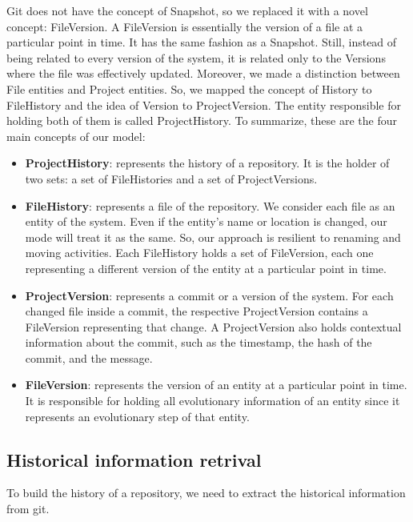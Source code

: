 Git does not have the concept of Snapshot, so we replaced it with a novel concept: FileVersion. 
A FileVersion is essentially the version of a file at a particular point in time. 
It has the same fashion as a Snapshot. Still, instead of being related to every version of the system, it is related only to the Versions where the file was effectively updated.
Moreover, we made a distinction between File entities and Project entities. So, we mapped the concept of History to FileHistory and the idea of Version to ProjectVersion. 
The entity responsible for holding both of them is called ProjectHistory. 
To summarize, these are the four main concepts of our model: 
\begin{itemize}
    \item \textbf{ProjectHistory}: represents the history of a repository. It is the holder of two sets: a set of FileHistories and a set of ProjectVersions. 
    \item \textbf{FileHistory}: represents a file of the repository. We consider each file as an entity of the system. Even if the entity's name or location is changed, our mode will treat it as the same. So, our approach is resilient to renaming and moving activities. Each FileHistory holds a set of FileVersion, each one representing a different version of the entity at a particular point in time.  
    \item \textbf{ProjectVersion}: represents a commit or a version of the system. 
    For each changed file inside a commit, the respective ProjectVersion contains a FileVersion representing that change.
    A ProjectVersion also holds contextual information about the commit, such as the timestamp, the hash of the commit, and the message.
    \item \textbf{FileVersion}: represents the version of an entity at a particular point in time.
    It is responsible for holding all evolutionary information of an entity since it represents an evolutionary step of that entity. 
\end{itemize}

\subsection*{Historical information retrival}
To build the history of a repository, we need to extract the historical information from git.\\

